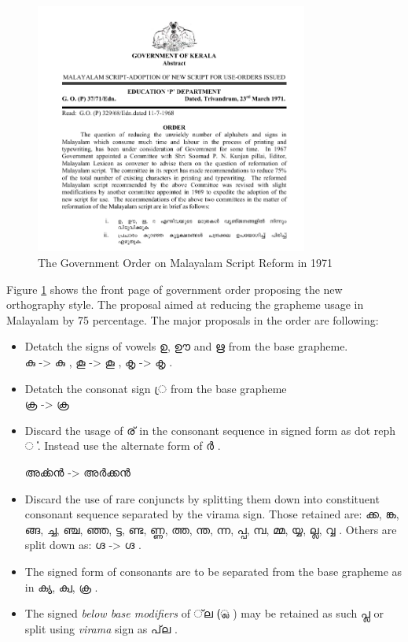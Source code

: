 \documentclass[10pt]{article}
\begin{document}
\begin{figure}[h!]
	\centering
	\includegraphics[width=0.8\textwidth]{images/1971-gov-script-reformation-order.png}
	\caption{The Government Order on Malayalam Script Reform in 1971}
	\label{go1971}
\end{figure}

Figure \ref{go1971} shows the front page of government order proposing the new orthography style. The proposal aimed at reducing the grapheme usage in Malayalam by 75 percentage. The major proposals in the order are following:\cite{1971go}

\begin{itemize}
\item
Detatch the signs of vowels {\manjari ഉ, ഊ and ഋ } from the base grapheme.\\
{\manjari കു } -> {\raghu കു } ,
{\manjari കൂ } -> {\raghu കൂ } ,
{\manjari കൃ } -> {\raghu കൃ } .

\item 
Detatch the consonat sign {\manjari  ്ര } from the base grapheme \\
{\manjari ക്ര  } -> {\raghu ക്ര  } 

\item
Discard the usage of {\manjari ര് } in the consonant sequence in signed form as dot reph {\manjari ൎ }. Instead use the alternate form of {\manjari ർ }.

 {\manjari അൎക്കൻ } -> {\manjari അർക്കൻ }

\item
Discard the use of rare conjuncts by splitting them down into constituent consonant sequence separated by the virama sign. Those retained are: {\manjari ക്ക, ങ്ക, ങ്ങ, ച്ച, ഞ്ച, ഞ്ഞ, ട്ട, ണ്ട, ണ്ണ, ത്ത, ന്ത, ന്ന, പ്പ, മ്പ, മ്മ, യ്യ, ല്ല, വ്വ }. Others are split down as: {\manjari ഗ്ദ } -> {\raghu ഗ്ദ }. 

\item
The signed form of consonants are to be separated from the base grapheme as in {\raghu ക്യ, ക്വ, ക്ര }.

\item
The signed \textit{below base modifiers} of {\manjari  ്‌ല  (്ല )  } may be retained as such {\manjari പ്ല } or split using \textit{virama} sign as {\manjari  പ്‌ല }.

\end{itemize}
\end{document}
